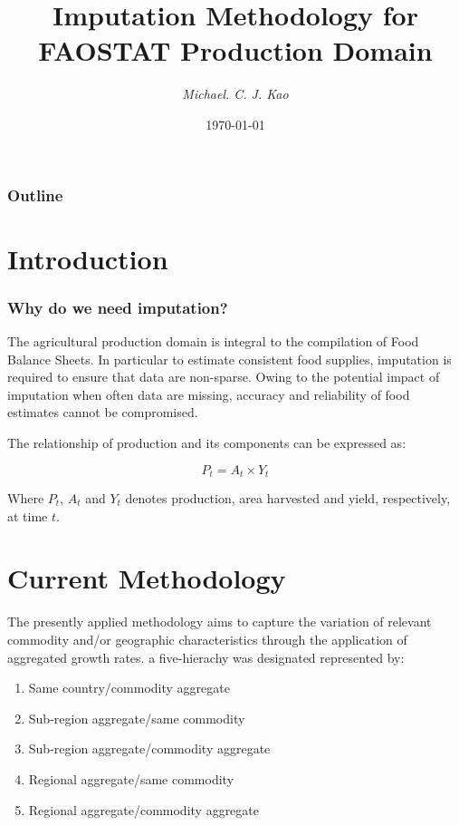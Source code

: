 \documentclass{beamer}
\title{Imputation Methodology for FAOSTAT Production Domain}
\author{\it Michael. C. J.  Kao}
\institute{Food and Agriculture Organization \\of the United Nation}
\date{\today}
\begin{document}
\frame{
  \titlepage
}

\begin{frame}
  \frametitle{Outline}
  \tableofcontents
\end{frame}

\section{Introduction}



\begin{frame}
  \frametitle{Why do we need imputation?}

  The agricultural production domain is integral to the compilation of
  Food Balance Sheets. In particular to estimate consistent food
  supplies, imputation is required to ensure that data are non-sparse.
  Owing to the potential impact of imputation when often data are
  missing, accuracy and reliability of food estimates cannot be
  compromised.
  
  \vspace{0.5cm}
  The relationship of production and its components can be expressed as:

  \begin{equation}
    P_t = A_t \times Y_t
  \end{equation}
  
  Where $P_t$, $A_t$ and $Y_t$ denotes production, area harvested and
  yield, respectively, at time $t$.

\end{frame}  


\section{Current Methodology}

\begin{frame}

  The presently applied methodology aims to capture the variation of relevant
  commodity and/or geographic characteristics through the application
  of aggregated growth rates. a five-hierachy was designated represented 
  by:

  \begin{enumerate}
    \item Same country/commodity aggregate
    \item Sub-region aggregate/same commodity
    \item Sub-region aggregate/commodity aggregate
    \item Regional aggregate/same commodity
    \item Regional aggregate/commodity aggregate
  \end{enumerate}

\end{frame}
\end{document}
